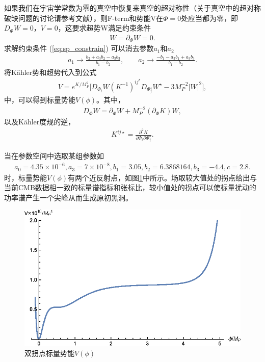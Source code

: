 如果我们在宇宙学常数为零的真空中恢复来真空的超对称性（关于真空中的超对称破缺问题的讨论请参考文献\citep{gao2015inflection}），则F-term和势能V在$\Phi=0$处应当都为零，即$D_{\Phi}W=0$，$V=0$，这要求超势W满足约束条件
\begin{align}\label{eq:sp_constrain}
    W=\partial_{\Phi}W=0.
\end{align}
求解约束条件 (\ref{eq:sp_constrain}) 可以消去参数$a_1$和$a_2$
\begin{align}
    a_1\rightarrow \frac{b_2+a_3b_2-a_3b_3}{b_1-b_2},\qquad 
    a_2\rightarrow \frac{-b_1-a_3b_1+a_3b_3}{b_1-b_2}.
\end{align}
将K\"ahler势和超势代入到公式
\begin{align}
    V=e^{K/M^2_P}\lbrack
    D_{\Phi_i}W{(K^{-1})}^{ij^{\star}}D_{\Phi^{\star}_j}W^{\star}-3M^{-2}_P|W|^2\rbrack,
\end{align}
中，可以得到标量势能$V(\phi)$。其中，
\begin{align}
    D_{\Phi}W=\partial_{\Phi}W+M^{-2}_P{(\partial_{\Phi}K)}W,
\end{align}
以及K\"ahler度规的逆，
\begin{align}
    K^{ij\star} = \frac{\partial^2K}{\partial\Phi_i\partial\Phi^{\star}_j}.
\end{align}

当在参数空间中选取某组参数如
\begin{align}\label{eq:parameters}
    a_0 = 4.35\times 10^{-6},
    a_3 = 7\times 10^{-8},
    b_1 = 3.05,
    b_2 = 6.3868164,
    b_3 = -4.4,
    c = 2.8.
\end{align}
时，标量势能$V(\phi)$有两个近反射点，如图\ref{fig:potential}中所示。场取较大值处的拐点给出与当前CMB数据相一致的标量谱指标和张标比，较小值处的拐点可以使标量扰动的功率谱产生一个尖峰从而生成原初黑洞。
\begin{figure}[!htbp]
    \centering
    \includegraphics[width=5in]{Img/potential.eps}
    \caption{双拐点标量势能$V(\phi)$}\label{fig:potential}
\end{figure}

